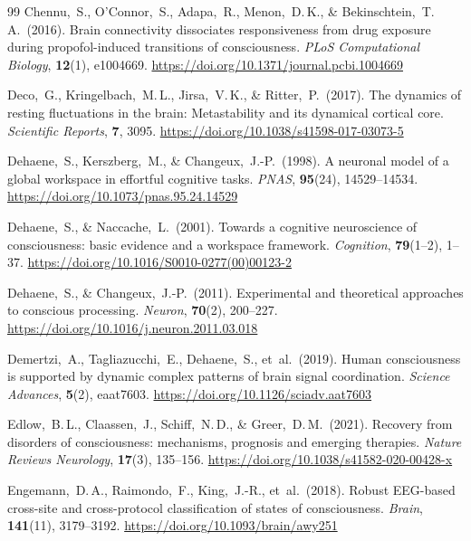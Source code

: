 ﻿\documentclass[11pt,a4paper]{article}
\theoremstyle{plain}
\theoremstyle{definition}
\theoremstyle{remark}
\begin{document}
\begin{thebibliography}{99}
Chennu,~S., O'Connor,~S., Adapa,~R., Menon,~D.\,K., \& Bekinschtein,~T.\,A.\ (2016).
Brain connectivity dissociates responsiveness from drug exposure during propofol-induced transitions of consciousness.
\textit{PLoS Computational Biology}, \textbf{12}(1), e1004669.
\url{https://doi.org/10.1371/journal.pcbi.1004669}

Deco,~G., Kringelbach,~M.\,L., Jirsa,~V.\,K., \& Ritter,~P.\ (2017).
The dynamics of resting fluctuations in the brain: Metastability and its dynamical cortical core.
\textit{Scientific Reports}, \textbf{7}, 3095.
\url{https://doi.org/10.1038/s41598-017-03073-5}

Dehaene,~S., Kerszberg,~M., \& Changeux,~J.-P.\ (1998).
A neuronal model of a global workspace in effortful cognitive tasks.
\textit{PNAS}, \textbf{95}(24), 14529--14534.
\url{https://doi.org/10.1073/pnas.95.24.14529}

Dehaene,~S., \& Naccache,~L.\ (2001).
Towards a cognitive neuroscience of consciousness: basic evidence and a workspace framework.
\textit{Cognition}, \textbf{79}(1--2), 1--37.
\url{https://doi.org/10.1016/S0010-0277(00)00123-2}

Dehaene,~S., \& Changeux,~J.-P.\ (2011).
Experimental and theoretical approaches to conscious processing.
\textit{Neuron}, \textbf{70}(2), 200--227.
\url{https://doi.org/10.1016/j.neuron.2011.03.018}

Demertzi,~A., Tagliazucchi,~E., Dehaene,~S., et~al.\ (2019).
Human consciousness is supported by dynamic complex patterns of brain signal coordination.
\textit{Science Advances}, \textbf{5}(2), eaat7603.
\url{https://doi.org/10.1126/sciadv.aat7603}

Edlow,~B.\,L., Claassen,~J., Schiff,~N.\,D., \& Greer,~D.\,M.\ (2021).
Recovery from disorders of consciousness: mechanisms, prognosis and emerging therapies.
\textit{Nature Reviews Neurology}, \textbf{17}(3), 135--156.
\url{https://doi.org/10.1038/s41582-020-00428-x}

Engemann,~D.\,A., Raimondo,~F., King,~J.-R., et~al.\ (2018).
Robust EEG-based cross-site and cross-protocol classification of states of consciousness.
\textit{Brain}, \textbf{141}(11), 3179--3192.
\url{https://doi.org/10.1093/brain/awy251}


\end{thebibliography}
\end{document}
